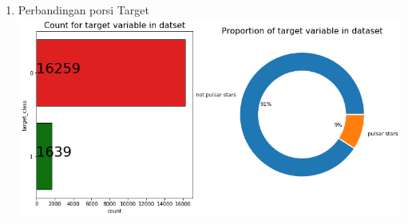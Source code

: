\documentclass[12pt]{article}
\begin{document}
\begin{enumerate}
        \item Perbandingan porsi Target
        \newline \includegraphics[scale=0.5]{proportion-target.png}
        

\end{enumerate}
\end{document}
